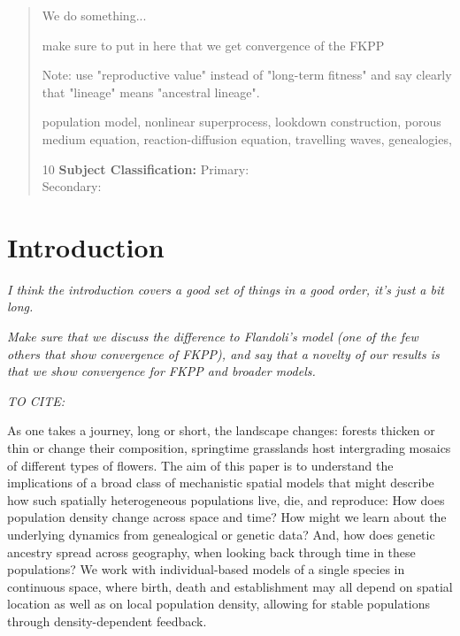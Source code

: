 \documentclass[12pt]{article}
\newcommand{\comment}[1]{{\color{blue} \it #1}}
\begin{document}
\date{\today}
\maketitle


\begin{abstract}

We do something...

make sure to put in here that we get convergence of the FKPP

Note: use "reproductive value" instead of "long-term fitness"
and say clearly that "lineage" means "ancestral lineage".

\vspace{.1in}


  population model, nonlinear superprocess, 
lookdown construction, porous medium equation, 
reaction-diffusion equation, travelling waves, genealogies,


\vspace{.1in}



10 {\bf Subject Classification:}  Primary:  
\\Secondary:   %
 
\end{abstract}
\tableofcontents
\newpage


\section{Introduction}

\comment{I think the introduction covers a good set of things in a good order, it's just a bit long.}

\comment{
    Make sure that we discuss the difference to Flandoli's model
    (one of the few others that show convergence of FKPP),
    and say that a novelty of our results is that we show convergence
    for FKPP and broader models.
}

\comment{TO CITE: \citet{ghosh2022emergent}}

As one takes a journey, long or short, the landscape changes:
forests thicken or thin or change their composition,
springtime grasslands host intergrading mosaics of different types of flowers.
The aim of this paper is to understand the implications of a broad class of mechanistic spatial models
that might describe how such spatially heterogeneous populations live, die, and reproduce:
How does population density change across space and time?
How might we learn about the underlying dynamics from genealogical or genetic data?
And,  how does genetic ancestry spread across geography,
when looking back through time in these populations?
We work with individual-based models of a single species in continuous space,
where birth, death and establishment may all depend on spatial location
as well as on local population density, allowing for stable populations through density-dependent feedback.
\end{document}
